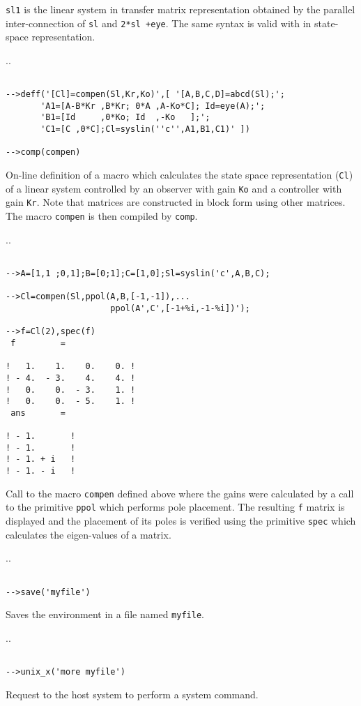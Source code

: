 {\tt sl1} is the linear system in transfer matrix representation
obtained by the parallel inter-connection of {\tt sl} and {\tt 2*sl +eye}.
The same syntax is valid with {\sl} in state-space representation.

\noindent.\dotfill.
\begin{verbatim}
 
-->deff('[Cl]=compen(Sl,Kr,Ko)',[ '[A,B,C,D]=abcd(Sl);';
       'A1=[A-B*Kr ,B*Kr; 0*A ,A-Ko*C]; Id=eye(A);';
       'B1=[Id     ,0*Ko; Id  ,-Ko   ];';
       'C1=[C ,0*C];Cl=syslin(''c'',A1,B1,C1)' ])
 
-->comp(compen)
\end{verbatim}
On-line definition of a macro which calculates the state space representation
({\tt Cl}) of a linear system controlled by an observer with gain {\tt Ko}
and a controller with gain {\tt Kr}.  Note that matrices are constructed
in block form using other matrices.  The macro {\tt compen} is then
compiled by {\tt comp}.

\noindent.\dotfill.
\begin{verbatim}
 
-->A=[1,1 ;0,1];B=[0;1];C=[1,0];Sl=syslin('c',A,B,C);
 
-->Cl=compen(Sl,ppol(A,B,[-1,-1]),...
                     ppol(A',C',[-1+%i,-1-%i])');
 
-->f=Cl(2),spec(f)
 f         =
 
!   1.    1.    0.    0. !
! - 4.  - 3.    4.    4. !
!   0.    0.  - 3.    1. !
!   0.    0.  - 5.    1. !
 ans       =
 
! - 1.       !
! - 1.       !
! - 1. + i   !
! - 1. - i   !
\end{verbatim}
Call to the macro {\tt compen} defined above where the gains were
calculated by a call to the primitive {\tt ppol} which performs pole
placement.
The resulting {\tt f} matrix is displayed and the placement
of its poles is verified using the primitive {\tt spec} which calculates
the eigen-values of a matrix.

\noindent.\dotfill.
\begin{verbatim}

-->save('myfile')
\end{verbatim}
Saves the environment in a file named {\tt myfile}.

\noindent.\dotfill.
\begin{verbatim}

-->unix_x('more myfile')
\end{verbatim}
Request to the host system to perform a system command.

